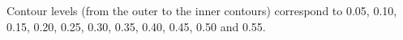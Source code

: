 Contour levels (from the outer to the inner contours) correspond to 0.05, 0.10, 0.15, 0.20, 0.25, 0.30, 0.35, 0.40, 0.45, 0.50 and 0.55.

